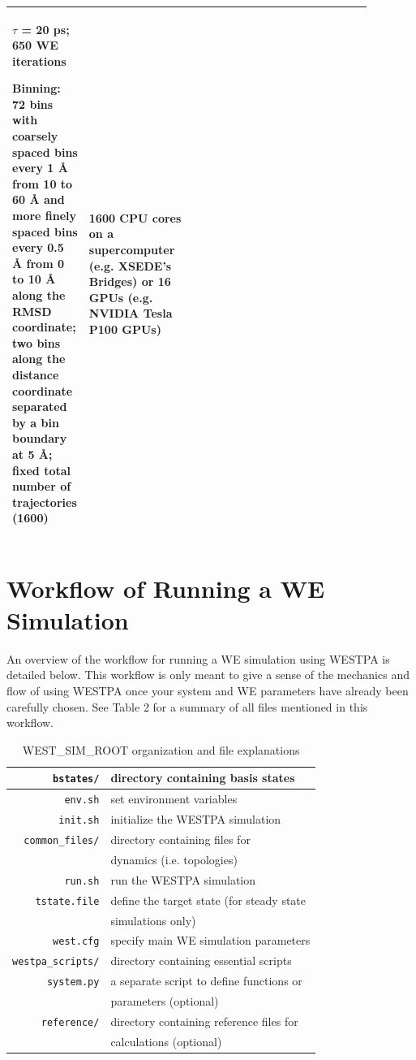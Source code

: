 \documentclass[9pt,tutorial,pubversion]{livecoms}
\begin{document}
\begin{table}
\begin{tabular}{ | p{0.11\linewidth} | p{0.30\linewidth} | p{0.30\linewidth} | p{0.17\linewidth} |}
$\tau$ = 20 ps; 650 WE iterations

Binning: 72 bins with coarsely spaced bins every 1 \AA{} from 10 to 60 \AA{} and more finely spaced bins every 0.5 \AA{} from 0 to 10 \AA{} along the RMSD coordinate; two bins along the distance coordinate separated by a bin boundary at 5 \AA{}; fixed total number of trajectories (1600)& 
1600 CPU cores on a supercomputer (e.g. XSEDE’s Bridges) or 16 GPUs (e.g. NVIDIA Tesla P100 GPUs) \\
\hline
\end{tabular}
\end{table}

\section{Workflow of Running a WE Simulation}

An overview of the workflow for running a WE simulation using WESTPA is detailed below. 
This workflow is only meant to give a sense of the mechanics and flow of using WESTPA once your system and WE parameters have already been carefully chosen. See Table 2 for a summary of all files mentioned in this workflow.

\begin{table}
\caption{WEST\_SIM\_ROOT organization and file explanations}
\centering
\begin{tabular}{| r | l |}
\hline
\verb|bstates/| & directory containing basis states \\
\hline
\verb|env.sh| & set environment variables \\
\hline
\verb|init.sh| & initialize the WESTPA simulation \\
\hline
\verb|common_files/| & directory containing files for \\
{} & dynamics (i.e. topologies) \\
\hline
\verb|run.sh| & run the WESTPA simulation \\
\hline
\verb|tstate.file| & define the target state (for steady state \\
{} & simulations only) \\
\hline
\verb|west.cfg| & specify main WE simulation parameters \\
\hline
\verb|westpa_scripts/| & directory containing essential scripts \\
\hline
\verb|system.py| & a separate script to define functions or \\
{} & parameters (optional) \\
\hline
\verb|reference/| & directory containing reference files for \\
{} & calculations (optional) \\
\hline
\end{tabular}
\end{table}
\end{document}
